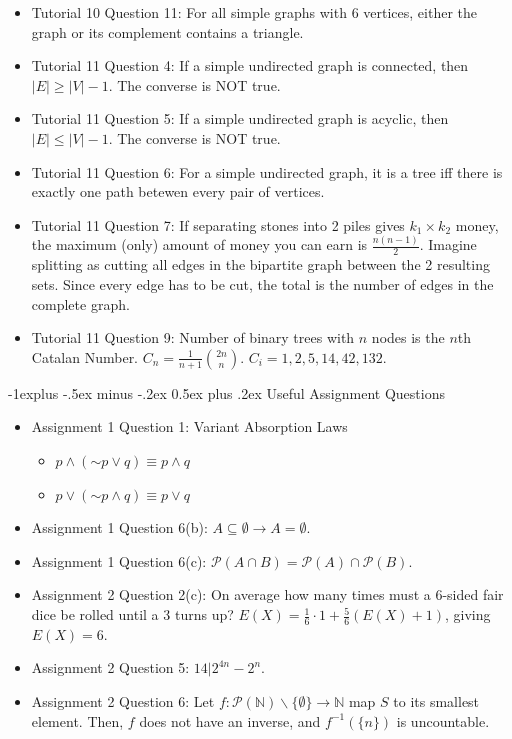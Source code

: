 \documentclass[10pt, portrait]{article}
\makeatletter
\renewcommand{\section}{\@startsection{section}{1}{0mm}%
                                {-1ex plus -.5ex minus -.2ex}%
                                {0.5ex plus .2ex}%
                                {\normalfont\large\bfseries}}
\renewcommand{\section}{\@startsection{section}{2}{0mm}%
                                {-1explus -.5ex minus -.2ex}%
                                {0.5ex plus .2ex}%
                                {\normalfont\normalsize\bfseries}}
\renewcommand{\lnot}{\mathord{\sim}}
\makeatother
\begin{document}
\begin{multicols*}{2}
\begin{itemize}
    \item Tutorial 10 Question 11: For all simple graphs with 6 vertices, either the graph or its complement contains a triangle.
    \item Tutorial 11 Question 4: If a simple undirected graph is connected, then $|E| \geq |V|-1$. The converse is NOT true.
    \item Tutorial 11 Question 5: If a simple undirected graph is acyclic, then $|E| \leq |V|-1$. The converse is NOT true.
    \item Tutorial 11 Question 6: For a simple undirected graph, it is a tree iff there is exactly one path betewen every pair of vertices.
    \item Tutorial 11 Question 7: If separating stones into 2 piles gives $k_1\times k_2$ money, the maximum (only) amount of money you can earn is $\frac{n(n-1)}{2}$. Imagine splitting as cutting all edges in the bipartite graph between the 2 resulting sets. Since every edge has to be cut, the total is the number of edges in the complete graph.
    \item Tutorial 11 Question 9: Number of binary trees with $n$ nodes is the $n$th Catalan Number. $C_n=\frac{1}{n+1}{2n \choose n}$. $C_i=1, 2, 5, 14, 42, 132$.
\end{itemize}

\section{Useful Assignment Questions}
\begin{itemize}
    \item Assignment 1 Question 1: Variant Absorption Laws
    \begin{itemize}
        \item $p \land (\lnot p \lor q)\equiv p\land q$
        \item $p \lor (\lnot p \land q)\equiv p \lor q$
    \end{itemize}
    \item Assignment 1 Question 6(b): $A \subseteq \emptyset \rightarrow A = \emptyset$.
    \item Assignment 1 Question 6(c): $\mathcal{P}(A\cap B)=\mathcal{P}(A)\cap\mathcal{P}(B)$.
    \item Assignment 2 Question 2(c): On average how many times must a 6-sided fair dice be rolled until a 3 turns up? $E(X)=\frac{1}{6}\cdot 1+\frac{5}{6}(E(X)+1)$, giving $E(X)=6$.
    \item Assignment 2 Question 5: $14 | 2^{4n}-2^n$.
    \item Assignment 2 Question 6: Let $f:\mathcal{P(\mathbb{N})\backslash\{\emptyset\}}\to\mathbb{N}$ map $S$ to its smallest element. Then, $f$ does not have an inverse, and $f^{-1}(\{n\})$ is uncountable.
\end{itemize}

\end{multicols*}
\end{document}
